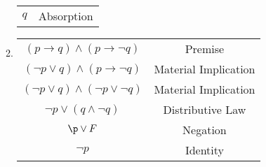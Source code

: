 \begin{enumerate}
\begin{solution}
\begin{enumerate}
\begin{tabular}{c|c}
            $q $ & Absorption\\
        \end{tabular}
        \item
        \begin{tabular}{c|c}
            $(p \rightarrow q) \land (p \rightarrow \neg q)$ &  Premise\\
            $(\neg p \lor q) \land (p \rightarrow \neg q)$ &  Material Implication\\
            $(\neg p \lor q) \land (\neg p \lor \neg q)$ &  Material Implication\\
            $\neg p \lor (q \land \neg q)$ & Distributive Law\\
            $\p \lor F$ & Negation\\
            $\neg p$ & Identity
        \end{tabular}
    \end{enumerate}
    \end{solution}
    

\end{enumerate}
